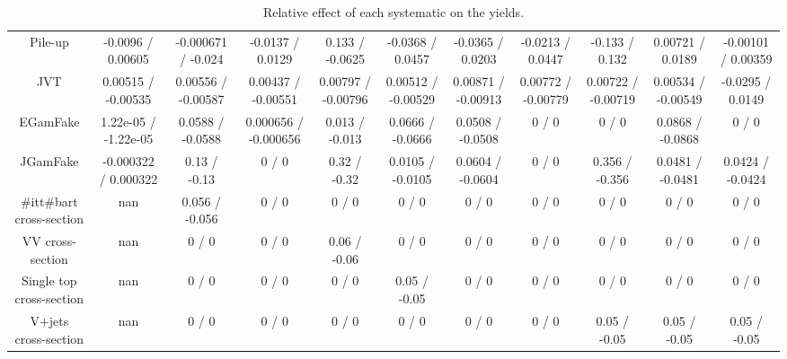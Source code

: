 \begin{table}[htbp]
\begin{center}
\begin{tabular}{|c|c|c|c|c|c|c|c|c|c|c|}
  Pile-up & -0.0096 / 0.00605 & -0.000671 / -0.024 & -0.0137 / 0.0129 & 0.133 / -0.0625 & -0.0368 / 0.0457 & -0.0365 / 0.0203 & -0.0213 / 0.0447 & -0.133 / 0.132 & 0.00721 / 0.0189 & -0.00101 / 0.00359 \\ 
  JVT & 0.00515 / -0.00535 & 0.00556 / -0.00587 & 0.00437 / -0.00551 & 0.00797 / -0.00796 & 0.00512 / -0.00529 & 0.00871 / -0.00913 & 0.00772 / -0.00779 & 0.00722 / -0.00719 & 0.00534 / -0.00549 & -0.0295 / 0.0149 \\ 
  EGamFake & 1.22e-05 / -1.22e-05 & 0.0588 / -0.0588 & 0.000656 / -0.000656 & 0.013 / -0.013 & 0.0666 / -0.0666 & 0.0508 / -0.0508 & 0 / 0 & 0 / 0 & 0.0868 / -0.0868 & 0 / 0 \\ 
  JGamFake & -0.000322 / 0.000322 & 0.13 / -0.13 & 0 / 0 & 0.32 / -0.32 & 0.0105 / -0.0105 & 0.0604 / -0.0604 & 0 / 0 & 0.356 / -0.356 & 0.0481 / -0.0481 & 0.0424 / -0.0424 \\ 
  #it{t#bar{t}} cross-section &    nan    & 0.056 / -0.056 & 0 / 0 & 0 / 0 & 0 / 0 & 0 / 0 & 0 / 0 & 0 / 0 & 0 / 0 & 0 / 0 \\ 
  VV cross-section &    nan    & 0 / 0 & 0 / 0 & 0.06 / -0.06 & 0 / 0 & 0 / 0 & 0 / 0 & 0 / 0 & 0 / 0 & 0 / 0 \\ 
  Single top cross-section &    nan    & 0 / 0 & 0 / 0 & 0 / 0 & 0.05 / -0.05 & 0 / 0 & 0 / 0 & 0 / 0 & 0 / 0 & 0 / 0 \\ 
  V+jets cross-section &    nan    & 0 / 0 & 0 / 0 & 0 / 0 & 0 / 0 & 0 / 0 & 0 / 0 & 0.05 / -0.05 & 0.05 / -0.05 & 0.05 / -0.05 \\ 
\hline 
\end{tabular} 
\caption{Relative effect of each systematic on the yields.} 
\end{center} 
\end{table} 
